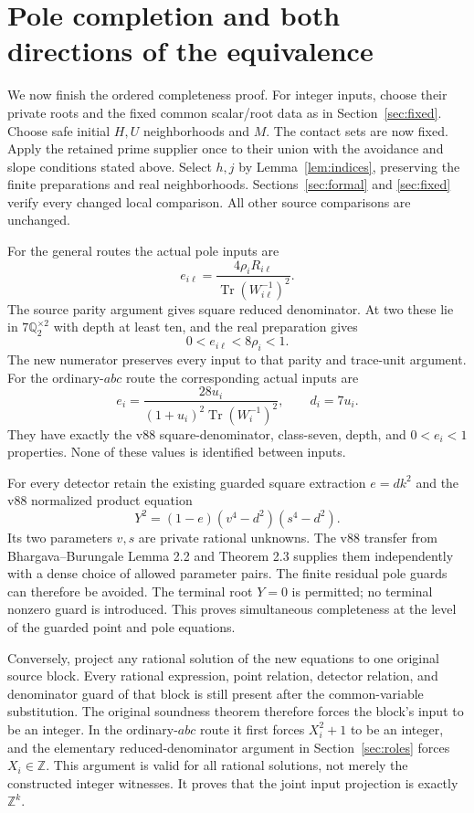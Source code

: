 \documentclass[11pt]{article}
\newcommand{\Q}{\mathbb Q}
\newcommand{\Z}{\mathbb Z}
\newcommand{\Tr}{\operatorname{Tr}}
\begin{document}
\section{Pole completion and both directions of the equivalence}
\label{sec:complete}

We now finish the ordered completeness proof. For integer inputs,
choose their private roots and the fixed common scalar/root
data as in Section~\ref{sec:fixed}. Choose safe initial \(H,U\)
neighborhoods and \(M\). The contact sets are now fixed.
Apply the retained prime supplier once to their union with
the avoidance and slope conditions stated above. Select
\(h,j\) by Lemma~\ref{lem:indices}, preserving the finite
preparations and real neighborhoods. Sections~\ref{sec:formal}
and \ref{sec:fixed} verify every changed local comparison.
All other source comparisons are unchanged.

For the general routes the actual pole inputs are
\[
             e_{i\ell}=
       \frac{4\rho_iR_{i\ell}}
            {\Tr(W_{i\ell}^{-1})^2}.
\]
The source parity argument gives square reduced denominator.
At two these lie in \(7\Q_2^{\times2}\) with depth at least
ten, and the real preparation gives
\[
                    0<e_{i\ell}<8\rho_i<1 .
\]
The new numerator preserves every input to that parity and
trace-unit argument. For the ordinary-\(abc\) route the
corresponding actual inputs are
\[
         e_i=\frac{28u_i}{(1+u_i)^2\Tr(W_i^{-1})^2},
                       \qquad d_i=7u_i .
\]
They have exactly the v88 square-denominator, class-seven,
depth, and \(0<e_i<1\) properties. None of these values is
identified between inputs.

For every detector retain the existing guarded square
extraction \(e=dk^2\) and the v88 normalized product equation
\[
                 Y^2=(1-e)(v^4-d^2)(s^4-d^2).
\]
Its two parameters \(v,s\) are private rational unknowns.
The v88 transfer from Bhargava--Burungale Lemma 2.2 and
Theorem 2.3 supplies them independently with a dense choice
of allowed parameter pairs. The finite residual pole guards
can therefore be avoided. The terminal root \(Y=0\) is
permitted; no terminal nonzero guard is introduced.
This proves simultaneous completeness at the level of the
guarded point and pole equations.

Conversely, project any rational solution of the new equations
to one original source block. Every rational expression,
point relation, detector relation, and denominator guard of
that block is still present after the common-variable
substitution. The original soundness theorem therefore
forces the block's input to be an integer. In the ordinary-\(abc\)
route it first forces \(X_i^2+1\) to be an integer, and the
elementary reduced-denominator argument in
Section~\ref{sec:roles} forces \(X_i\in\Z\).
This argument is valid for all rational solutions, not merely
the constructed integer witnesses. It proves that the joint
input projection is exactly \(\Z^k\).
\end{document}
